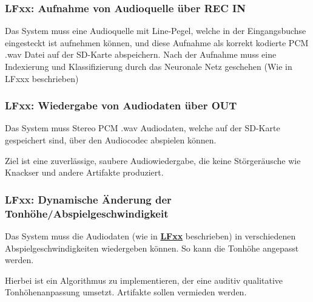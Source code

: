 
\subsubsection{LFxx: Aufnahme von Audioquelle über REC IN}
\label{lf-audiorecord}

Das System muss eine Audioquelle mit Line-Pegel, welche in der Eingangsbuchse eingesteckt ist aufnehmen können, und diese Aufnahme als korrekt kodierte PCM .wav Datei auf der SD-Karte abspeichern. Nach der Aufnahme muss eine Indexierung und Klassifizierung durch das Neuronale Netz geschehen (Wie in LFxxx beschrieben)


\subsubsection{LFxx: Wiedergabe von Audiodaten über OUT}
\label{lf-audioplayback}

Das System muss Stereo PCM .wav Audiodaten, welche auf der SD-Karte gespeichert sind, über den Audiocodec abspielen können.

Ziel ist eine zuverlässige, saubere Audiowiedergabe, die keine Störgeräusche wie Knackser und andere Artifakte produziert.

\subsubsection{LFxx: Dynamische Änderung der Tonhöhe/Abspielgeschwindigkeit}
\label{lf-pitchaudio}

Das System muss die Audiodaten (wie in \textbf{\hyperlink{lf-audioplayback}{LFxx}} beschrieben) in verschiedenen Abspielgeschwindigkeiten wiedergeben können. So kann die Tonhöhe angepasst werden.

Hierbei ist ein Algorithmus zu implementieren, der eine auditiv qualitative Tonhöhenanpassung umsetzt. Artifakte sollen vermieden werden.
